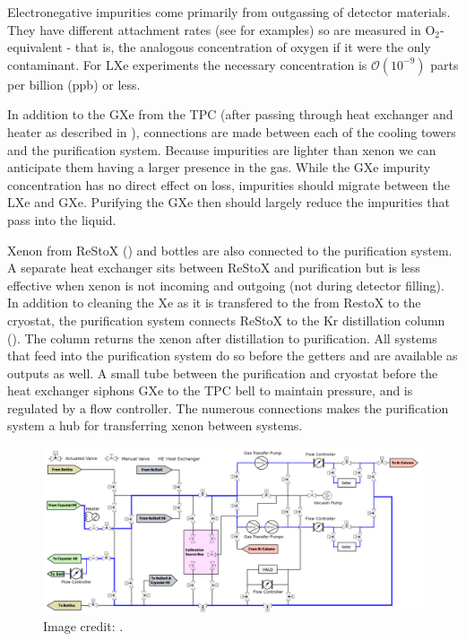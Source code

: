 Electronegative impurities come primarily from outgassing of detector materials.  They have different \electron attachment rates (see
 for examples) so are measured in O$_2$-equivalent - that is, the analogous concentration of oxygen if it
were the only contaminant.  For LXe experiments the necessary concentration is $\mathcal{O}(10^{-9})$ parts per billion (ppb) or less.

In addition
to the GXe from the TPC (after passing through heat exchanger and heater as described in ), connections are
made between
each of the cooling towers and the purification system.  Because impurities are lighter than xenon we can anticipate them having a larger
presence in the gas.  While the GXe impurity concentration has no direct effect on \electron loss, impurities should migrate between the
LXe and GXe.  Purifying the GXe then should largely reduce the impurities that pass into the liquid.

Xenon from ReStoX  () and bottles are also connected to the purification system.  A separate heat exchanger
sits between ReStoX and purification but is less effective when xenon is not incoming and outgoing (not during detector filling).  In
addition to cleaning the Xe as it is transfered to the from RestoX to the cryostat, the purification system connects ReStoX to the Kr
distillation column ().  The column returns the xenon after distillation to purification.  All systems that
feed into the purification system do so before the getters and are available as outputs as well.  A small tube between the purification
and cryostat before the heat exchanger siphons GXe to the TPC bell to maintain pressure, and is regulated by a flow controller.  The
numerous connections makes the purification system a hub for transferring xenon between systems.

\begin{figure}
\centering
\includegraphics[width=\textwidth]{PurificationLayout}
\caption{Image credit: .}
\label{fig:xenon1t_pur_schematic}
\end{figure}

